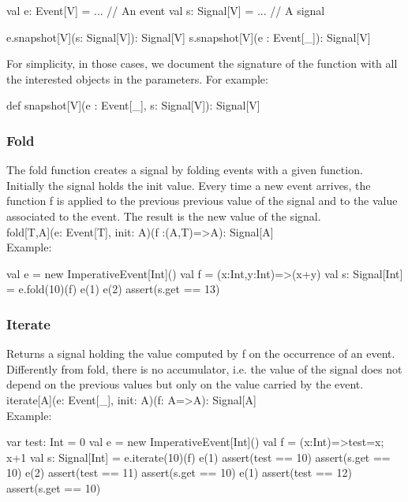 \documentclass[10pt,a4paper]{article}
\newcommand{\code}[1]{{\fontfamily{cmtt}\small\selectfont#1}}
\begin{document}
\begin{codenv}
val e: Event[V]  = ... // An event
val s: Signal[V] = ... // A signal

e.snapshot[V](s: Signal[V]): Signal[V]
s.snapshot[V](e : Event[_]): Signal[V]
\end{codenv}


For simplicity, in those cases, we document the signature of the
function with all the interested objects in the parameters. For
example:

\begin{codenv}
def snapshot[V](e : Event[_], s: Signal[V]): Signal[V]
\end{codenv}


\subsubsection{Fold}
The \code{fold} function creates a signal by folding events with a
given function. Initially the signal holds the \code{init}
value. Every time a new event arrives, the function \code{f} is
applied to the previous previous value of the signal and to the value
associated to the event. The result is the new value of the signal.
\\

\code{fold[T,A](e: Event[T], init: A)(f :(A,T)=>A): Signal[A]}
\\

\noindent
Example:

\begin{codenv}
val e = new ImperativeEvent[Int]()
val f = (x:Int,y:Int)=>(x+y)
val s: Signal[Int] = e.fold(10)(f)
e(1)
e(2)
assert(s.get == 13)
\end{codenv}


\subsubsection{Iterate}
Returns a signal holding the value computed by \code{f} on the
occurrence of an event. Differently from \code{fold}, there is no
accumulator, i.e. the value of the signal does not depend on the
previous values but only on the value carried by the event.
\\

\code{iterate[A](e: Event[\_], init: A)(f: A=>A): Signal[A]}
\\

\noindent
Example:

\begin{codenv}
var test: Int = 0
val e = new ImperativeEvent[Int]()
val f = (x:Int)=>{test=x; x+1}
val s: Signal[Int] = e.iterate(10)(f)
e(1)
assert(test == 10)
assert(s.get == 10)
e(2)
assert(test == 11)
assert(s.get == 10)
e(1)
assert(test == 12)
assert(s.get == 10)
\end{codenv}
\end{document}
